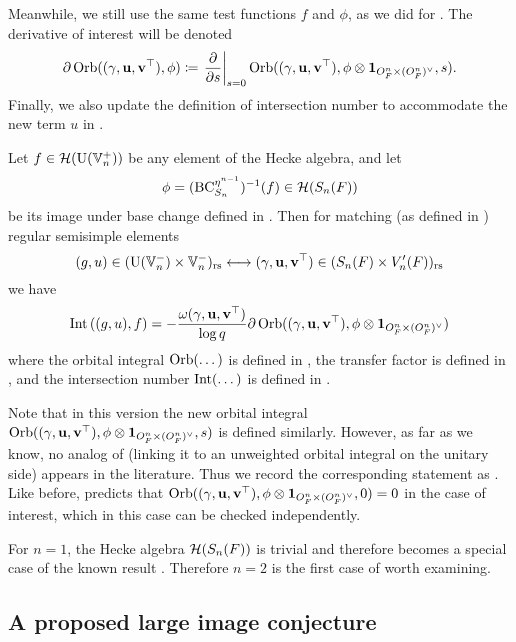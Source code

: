 Meanwhile, we still use the same test functions $f$ and $\phi$,
as we did for \cite[Conjecture 6.2.1]{ref:AFLspherical}.
The derivative of interest will be denoted
\[ \partial \operatorname{Orb}({(\gamma, \mathbf u, \mathbf v^\top)}, \phi) \coloneqq
  \left. \pdv{}{s} \right\rvert_{s=0}
  \operatorname{Orb}((\gamma, \mathbf u, \mathbf v^\top), \phi \otimes \mathbf{1}_{O_F^n \times (O_F^n)^\vee}, s). \]
Finally, we also update the definition of intersection number
to accommodate the new term $u$ in .
\begin{conjecture}
  Let $f \in \mathcal H(\operatorname{U}(\mathbb V_n^+))$ be any element of the Hecke algebra, and let
  \[ \phi = (\operatorname{BC}_{S_n}^{\eta^{n-1}})^{-1}(f) \in \mathcal H(S_n(F)) \]
  be its image under base change defined in .
  Then for matching (as defined in ) regular semisimple elements
  \[ (g, u) \in (\operatorname{U}(\mathbb V_n^-) \times \mathbb V_n^-)_{\mathrm{rs}} \longleftrightarrow
    {(\gamma, \mathbf u, \mathbf v^\top)} \in (S_n(F) \times V'_n(F))_{\mathrm{rs}} \]
  we have
  \begin{equation}
    \operatorname{Int}\left( (g,u), f \right) = -\frac{\omega{(\gamma, \mathbf u, \mathbf v^\top)}}{\log q} \partial \operatorname{Orb}({(\gamma, \mathbf u, \mathbf v^\top)}, \phi \otimes \mathbf{1}_{O_F^n \times (O_F^n)^\vee})
  \end{equation}
  where the orbital integral $\operatorname{Orb}(\dots)$ is defined in ,
  the transfer factor is defined in ,
  and the intersection number $\operatorname{Int}(\dots)$ is defined in .
  \label{conj:semi_lie_spherical}
\end{conjecture}
Note that in this version the new orbital integral $\operatorname{Orb}({(\gamma, \mathbf u, \mathbf v^\top)}, \phi \otimes \mathbf{1}_{O_F^n \times (O_F^n)^\vee}, s)$
is defined similarly.
However, as far as we know, no analog of 
(linking it to an unweighted orbital integral on the unitary side) appears in the literature.
Thus we record the corresponding statement as .
Like before, 
predicts that $\operatorname{Orb}({(\gamma, \mathbf u, \mathbf v^\top)}, \phi \otimes \mathbf{1}_{O_F^n \times (O_F^n)^\vee}, 0) = 0$ in the case of interest,
which in this case can be checked independently.

\begin{remark}
  For $n = 1$, the Hecke algebra $\mathcal H(S_n(F))$ is trivial
  and therefore 
  becomes a special case of the known result \cite{ref:liuFJ}.
  Therefore $n=2$ is the first case of  worth examining.
\end{remark}

\subsection{A proposed large image conjecture}
\label{sec:intro_large_kernel}

